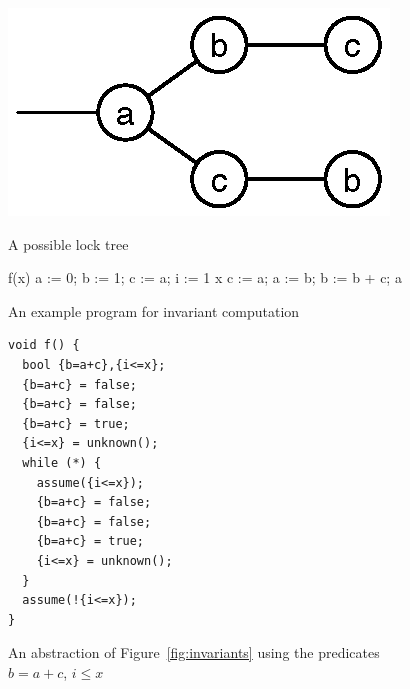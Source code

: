 \documentclass{article}
\begin{document}
\begin{multicols}{2}
\begin{figure}
  \hfill
  \begin{minipage}[t]{.30\textwidth}
    \vspace{0.43 in}
    \begin{center}
      \leavevmode
      \includegraphics{tree}
    \end{center}
    \vspace{0.43 in}
    \caption{A possible lock tree}
    \label{fig:tree}
  \end{minipage}
  \hfill
  \begin{minipage}[t]{.30\textwidth}
    \vspace{0.26 in}
    \begin{program}
      \FUNCT f(x) \BODY
      \EXP a := 0;
      b := 1;
      c := a;
      \FOR i := 1 \TO x  \DO
      c := a;
      a := b;
      b := b + c;
      \OD 
      a \ENDEXP \ENDFUNCT
    \end{program}
    \vspace{0.26 in}
    \caption{An example program for invariant computation}
    \label{fig:invariants}
  \end{minipage}
  \hfill  
  \begin{minipage}[t]{.30\textwidth}
    \begin{center}
      \begin{small}
\begin{verbatim}
void f() {
  bool {b=a+c},{i<=x};
  {b=a+c} = false;
  {b=a+c} = false;
  {b=a+c} = true;
  {i<=x} = unknown();
  while (*) {
    assume({i<=x});
    {b=a+c} = false;
    {b=a+c} = false;
    {b=a+c} = true;
    {i<=x} = unknown();
  }
  assume(!{i<=x});
}
\end{verbatim}
      \end{small}
    \end{center}
    \caption{An abstraction of Figure~\ref{fig:invariants} using the predicates $b=a+c$, $i \leq x$}
    \label{fig:bebop}
  \end{minipage}
  \hfill
\end{figure}


\end{multicols}
\end{document}

